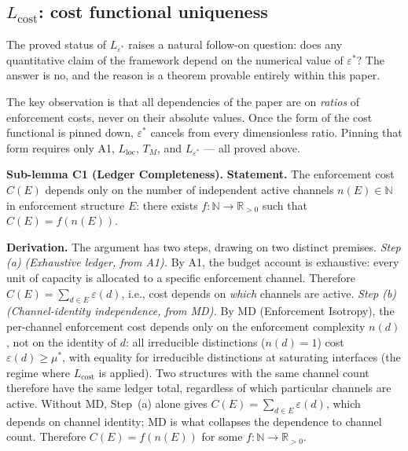 \documentclass[11pt]{article}
\theoremstyle{remark}
\begin{document}

\subsection{\texorpdfstring{$L_{\mathrm{cost}}$}{L cost}: cost functional uniqueness}
\label{sec:L_cost}\label{sec:L_map}

The proved status of $L_{\varepsilon^*}$ raises a natural follow-on question: does any quantitative claim of the framework depend on the numerical value of $\varepsilon^*$?  The answer is no, and the reason is a theorem provable entirely within this paper.

The key observation is that all dependencies of the paper are on \emph{ratios} of enforcement costs, never on their absolute values.  Once the form of the cost functional is pinned down, $\varepsilon^*$ cancels from every dimensionless ratio.  Pinning that form requires only A1, $L_{\mathrm{loc}}$, $T_M$, and $L_{\varepsilon^*}$ — all proved above.


\medskip\noindent\textbf{Sub-lemma C1 (Ledger Completeness).}
\textbf{Statement.}  The enforcement cost $C(E)$ depends only on the number of independent active channels $n(E) \in \mathbb{N}$ in enforcement structure $E$: there exists $f: \mathbb{N} \to \mathbb{R}_{>0}$ such that $C(E) = f(n(E))$.

\smallskip\noindent\textbf{Derivation.}  The argument has two steps, drawing on two distinct premises.  \textit{Step (a) (Exhaustive ledger, from A1).}  By A1, the budget account is exhaustive: every unit of capacity is allocated to a specific enforcement channel.  Therefore $C(E) = \sum_{d \in E} \varepsilon(d)$, i.e., cost depends on \emph{which} channels are active.  \textit{Step (b) (Channel-identity independence, from MD).}  By MD (Enforcement Isotropy), the per-channel enforcement cost depends only on the enforcement complexity $n(d)$, not on the identity of $d$: all irreducible distinctions ($n(d) = 1$) cost $\varepsilon(d) \ge \mu^*$, with equality for irreducible distinctions at saturating interfaces (the regime where $L_{\mathrm{cost}}$ is applied).  Two structures with the same channel count therefore have the same ledger total, regardless of which particular channels are active.  Without MD, Step~(a) alone gives $C(E) = \sum_{d \in E} \varepsilon(d)$, which depends on channel identity; MD is what collapses the dependence to channel count.  Therefore $C(E) = f(n(E))$ for some $f: \mathbb{N} \to \mathbb{R}_{>0}$.
\end{document}
